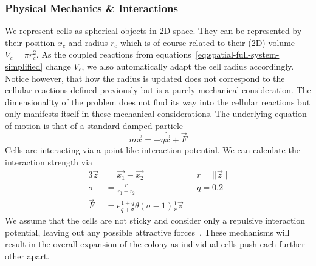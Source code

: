\documentclass[10pt,A4paper]{article}
\numberwithin{equation}{section}
\begin{document}
\subsubsection{Physical Mechanics \& Interactions}
We represent cells as spherical objects in 2D space.
They can be represented by their position $x_c$ and radius $r_c$ which is of course related to their (2D) volume $V_c = \pi r_c^2$.
As the coupled reactions from equations~\eqref{eq:spatial-full-system-simplified} change $V_c$, we also automatically adapt the cell radius accordingly.
Notice however, that how the radius is updated does not correspond to the cellular reactions defined previously but is a purely mechanical consideration.
The dimensionality of the problem does not find its way into the cellular reactions but only manifests itself in these mechanical considerations.
The underlying equation of motion is that of a standard damped particle
\begin{equation}
    m \ddot{\vec{x}} = -\eta\dot{\vec{x}} + \vec{F}
\end{equation}
Cells are interacting via a point-like interaction potential.
We can calculate the interaction strength via
\begin{alignat}{3}
    \vec{z} &= \vec{x_1} - \vec{x_2} \hspace{2em}&& r = ||\vec{z}||\\
    \sigma &= \frac{r}{r_1+r_2} && q=0.2\\
    \vec{F} &= \epsilon \frac{1+q}{q+\sigma} \theta(\sigma - 1) \frac{1}{r}\vec{z}
\end{alignat}
We assume that the cells are not sticky and consider only a repulsive interaction potential, leaving out any possible attractive forces~\cite{Garrett2008}.
These mechanisms will result in the overall expansion of the colony as individual cells push each further other apart.
%
%
%
\end{document}
